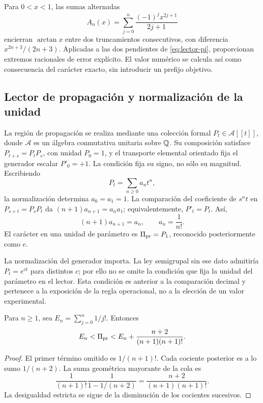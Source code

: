 Para \(0<x<1\), las sumas alternadas
\[
 A_n(x)=\sum_{j=0}^n\frac{(-1)^jx^{2j+1}}{2j+1}
\]
encierran \(\arctan x\) entre dos truncamientos consecutivos, con diferencia \(x^{2n+3}/(2n+3)\). Aplicadas a las dos pendientes de \eqref{eq:lector-pi}, proporcionan extremos racionales de error explícito. El valor numérico se calcula así como consecuencia del carácter exacto, sin introducir un prefijo objetivo.

\subsection{Lector de propagación y normalización de la unidad}

La región de propagación se realiza mediante una colección formal \(P_t\in\mathcal A[[t]]\), donde \(\mathcal A\) es un álgebra conmutativa unitaria sobre \(\mathbb Q\). Su composición satisface \(P_{t+s}=P_tP_s\), con unidad \(P_0=1\), y el transporte elemental orientado fija el generador escalar \(P'_0=+1\). La condición fija su signo, no sólo su magnitud. Escribiendo
\[
 P_t=\sum_{n\ge0}a_nt^n,
\]
la normalización determina \(a_0=a_1=1\). La comparación del coeficiente de \(s^nt\) en \(P_{s+t}=P_sP_t\) da \((n+1)a_{n+1}=a_na_1\); equivalentemente, \(P'_t=P_t\). Así,
\begin{equation}
 (n+1)a_{n+1}=a_n,\qquad a_n=\frac1{n!}.
 \label{eq:propagacion}
\end{equation}
El carácter en una unidad de parámetro es \(\Pi_{\rm pr}=P_1\), reconocido posteriormente como \(e\).

La normalización del generador importa. La ley semigrupal sin ese dato admitiría \(P_t=e^{ct}\) para distintos \(c\); por ello no se omite la condición que fija la unidad del parámetro en el lector. Esta condición es anterior a la comparación decimal y pertenece a la exposición de la regla operacional, no a la elección de un valor experimental.

\begin{proposition}
Para \(n\ge1\), sea \(E_n=\sum_{j=0}^n1/j!\). Entonces
\[
 E_n<\Pi_{\rm pr}<E_n+\frac{n+2}{(n+1)(n+1)!}.
\]
\end{proposition}
\begin{proof}
El primer término omitido es \(1/(n+1)!\). Cada cociente posterior es a lo sumo \(1/(n+2)\). La suma geométrica mayorante de la cola es
\[
 \frac1{(n+1)!}\frac1{1-1/(n+2)}
 =\frac{n+2}{(n+1)(n+1)!}.
\]
La desigualdad estricta se sigue de la disminución de los cocientes sucesivos.
\end{proof}

